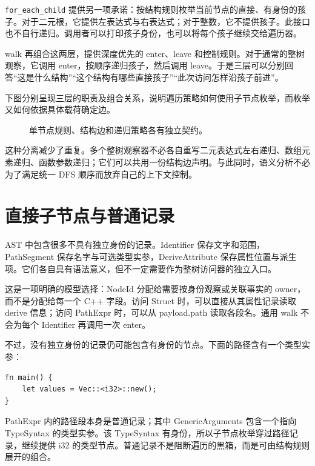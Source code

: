 \texttt{for\_each\_child} 提供另一项承诺：按结构规则枚举当前节点的直接、有身份的孩子。对于二元根，它提供左表达式与右表达式；对于整数，它不提供孩子。此接口也不自行递归。调用者可以打印孩子身份，也可以将每个孩子继续交给遍历器。

walk 再组合这两层，提供深度优先的 enter、leave 和控制规则。对于通常的整树观察，它调用 enter，按顺序递归孩子，然后调用 leave。于是三层可以分别回答“这是什么结构”“这个结构有哪些直接孩子”“此次访问怎样沿孩子前进”。

下图分别呈现三层的职责及组合关系，说明遍历策略如何使用子节点枚举，而枚举又如何依据具体载荷确定边。
\begin{figure}[htbp]
\centering
{}
\caption{单节点规则、结构边和递归策略各有独立契约。}
\end{figure}
这种分离减少了重复。多个整树观察器不必各自重写二元表达式左右递归、数组元素递归、函数参数递归；它们可以共用一份结构边声明。与此同时，语义分析不必为了满足统一 DFS 顺序而放弃自己的上下文控制。

\section{直接子节点与普通记录}
AST 中包含很多不具有独立身份的记录。Identifier 保存文字和范围，PathSegment 保存名字与可选类型实参，DeriveAttribute 保存属性位置与派生项。它们各自具有语法意义，但不一定需要作为整树访问器的独立入口。

这是一项明确的模型选择：NodeId 分配给需要按身份观察或关联事实的 owner，而不是分配给每一个 C++ 字段。访问 Struct 时，可以直接从其属性记录读取 derive 信息；访问 PathExpr 时，可以从 payload.path 读取各段名。通用 walk 不会为每个 Identifier 再调用一次 enter。

不过，没有独立身份的记录仍可能包含有身份的节点。下面的路径含有一个类型实参：
\begin{lstlisting}[language=Rustless]
fn main() {
    let values = Vec::<i32>::new();
}
\end{lstlisting}
PathExpr 内的路径段本身是普通记录；其中 GenericArguments 包含一个指向 TypeSyntax 的类型实参。该 TypeSyntax 有身份，所以子节点枚举穿过路径记录，继续提供 i32 的类型节点。普通记录不是阻断遍历的黑箱，而是可由结构规则展开的组合。


